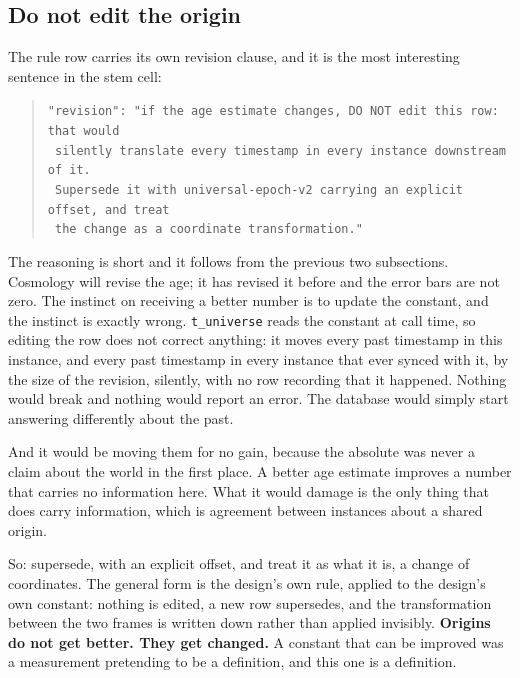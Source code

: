 \subsection{Do not edit the origin}

The rule row carries its own revision clause, and it is the most interesting sentence in the stem cell:

\begin{quote}
\texttt{"revision": "if the age estimate changes, DO NOT edit this row: that would}\\
\texttt{ silently translate every timestamp in every instance downstream of it.}\\
\texttt{ Supersede it with universal-epoch-v2 carrying an explicit offset, and treat}\\
\texttt{ the change as a coordinate transformation."}
\end{quote}

The reasoning is short and it follows from the previous two subsections. Cosmology will revise the age; it has revised it before and the error bars are not zero. The instinct on receiving a better number is to update the constant, and the instinct is exactly wrong. \texttt{t\_universe} reads the constant at call time, so editing the row does not correct anything: it moves every past timestamp in this instance, and every past timestamp in every instance that ever synced with it, by the size of the revision, silently, with no row recording that it happened. Nothing would break and nothing would report an error. The database would simply start answering differently about the past.

And it would be moving them for no gain, because the absolute was never a claim about the world in the first place. A better age estimate improves a number that carries no information here. What it would damage is the only thing that does carry information, which is agreement between instances about a shared origin.

So: supersede, with an explicit offset, and treat it as what it is, a change of coordinates. The general form is the design's own rule, applied to the design's own constant: nothing is edited, a new row supersedes, and the transformation between the two frames is written down rather than applied invisibly. \textbf{Origins do not get better. They get changed.} A constant that can be improved was a measurement pretending to be a definition, and this one is a definition.

